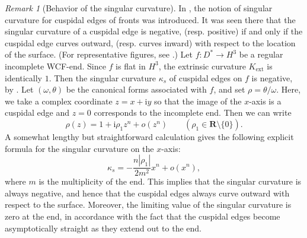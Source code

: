 \documentclass[a4paper]{amsart}
\theoremstyle{plain}
\theoremstyle{remark}
\newtheorem{remark}[theorem]{Remark}
\numberwithin{equation}{section}
\begin{document}
\begin{remark}[Behavior of the singular curvature]
 In \cite{SUY}, 
 the notion of singular curvature 
 for cuspidal edges of fronts was introduced.  
 It was seen there that the singular curvature of a cuspidal edge is
 negative, (resp. positive) if and only if the cuspidal edge curves 
 outward, (resp. curves inward) with respect to the 
 location of the surface. 
 (For representative figures, see \cite{SUY}.)
 Let $f \colon D^*\to H^3$ be a regular incomplete WCF-end.
 Since $f$ is flat in $H^3$, the extrinsic curvature ${K_{\mathrm{ext}}}$ is 
 identically $1$. 
 Then the singular curvature $\kappa_s$ 
 of cuspidal edges on $f$ is negative, 
 by \cite[Theorem 3.1]{SUY}.
 Let $(\omega,\theta)$ be the canonical forms associated with $f$,
 and set $\rho=\theta/\omega$.
 Here, we take a complex coordinate $z=x+{\mathrm{i}} y$ so that
 the image of the $x$-axis is a cuspidal edge and $z=0$ 
 corresponds to the incomplete end.
 Then  we can write
 \[
       \rho(z)=1+{\mathrm{i}} \rho_1 z^n + o(z^n) \qquad (
             \rho_1\in{\boldsymbol{R}}\setminus\{0\}).
 \]
 A somewhat lengthy but straightforward calculation 
 gives the following explicit formula for the
 singular curvature on the $x$-axis:
 \begin{equation*}
  \kappa_s = -\frac{n|\rho_1|}{2m^2}x^n + o(x^n),
 \end{equation*}
 where $m$ is the multiplicity of the end.
 This implies that the singular curvature is 
 always negative, and hence that the cuspidal edges always curve 
 outward with respect to the surface.  Moreover,
 the limiting value of the singular curvature is zero at the end, 
 in accordance with the fact that the cuspidal edges become 
 asymptotically straight as they extend out to the end.  
\end{remark}
\end{document}
